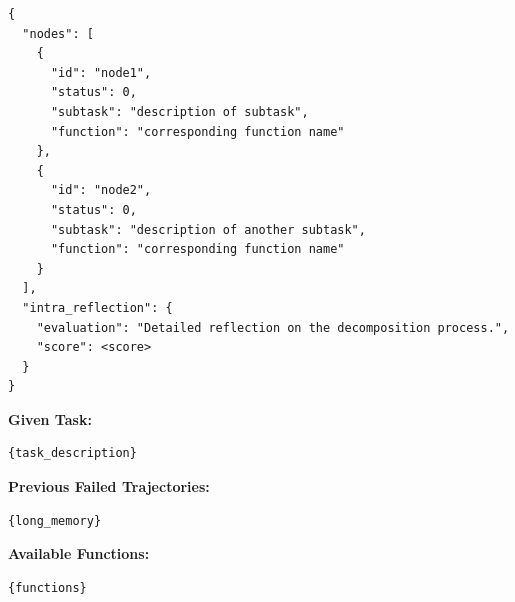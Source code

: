 \documentclass{article}
\begin{document}
\begin{tcolorbox}[
    breakable,
    colback=blue!5!white,
    colframe=blue!75!black,
    title=Planner Agent System Prompt,
    fonttitle=\bfseries
]
\begin{Verbatim}
{
  "nodes": [
    {
      "id": "node1",
      "status": 0,
      "subtask": "description of subtask",
      "function": "corresponding function name"
    },
    {
      "id": "node2",
      "status": 0,
      "subtask": "description of another subtask",
      "function": "corresponding function name"
    }
  ],
  "intra_reflection": {
    "evaluation": "Detailed reflection on the decomposition process.",
    "score": <score>
  }
}
\end{Verbatim}
\end{tcolorbox}



\begin{tcolorbox}[
    breakable,
    colback=blue!5!white,
    colframe=blue!75!black,
    title=Planner Agent User Prompt,
    fonttitle=\bfseries
]

\textbf{Given Task:}
\begin{Verbatim}
{task_description}
\end{Verbatim}

\textbf{Previous Failed Trajectories:}
\begin{Verbatim}
{long_memory}
\end{Verbatim}

\textbf{Available Functions:}
\begin{Verbatim}
{functions}
\end{Verbatim}

\end{tcolorbox}
\end{document}
